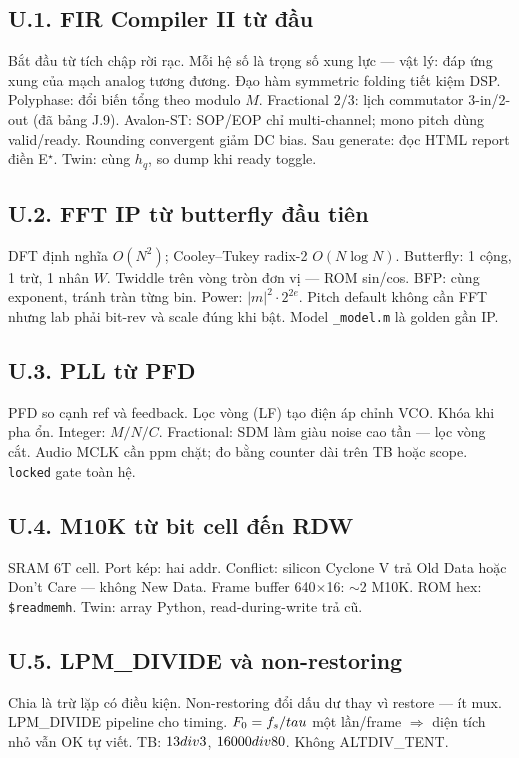 \subsection*{U.1. FIR Compiler II từ đầu}
Bắt đầu từ tích chập rời rạc. Mỗi hệ số là trọng số xung lực --- vật lý: đáp ứng xung của mạch analog tương đương. Đạo hàm symmetric folding tiết kiệm DSP. Polyphase: đổi biến tổng theo modulo $M$. Fractional $2/3$: lịch commutator 3-in/2-out (đã bảng J.9). Avalon-ST: SOP/EOP chỉ multi-channel; mono pitch dùng valid/ready. Rounding convergent giảm DC bias. Sau generate: đọc HTML report điền E$^\star$. Twin: cùng $h_q$, so dump khi ready toggle.

\subsection*{U.2. FFT IP từ butterfly đầu tiên}
DFT định nghĩa $O(N^2)$; Cooley--Tukey radix-2 $O(N\log N)$. Butterfly: 1 cộng, 1 trừ, 1 nhân $W$. Twiddle trên vòng tròn đơn vị --- ROM sin/cos. BFP: cùng exponent, tránh tràn từng bin. Power: $|m|^2\cdot 2^{2e}$. Pitch default không cần FFT nhưng lab phải bit-rev và scale đúng khi bật. Model \texttt{\_model.m} là golden gần IP.

\subsection*{U.3. PLL từ PFD}
PFD so cạnh ref và feedback. Lọc vòng (LF) tạo điện áp chỉnh VCO. Khóa khi pha ổn. Integer: $M/N/C$. Fractional: SDM làm giàu noise cao tần --- lọc vòng cắt. Audio MCLK cần ppm chặt; đo bằng counter dài trên TB hoặc scope. \texttt{locked} gate toàn hệ.

\subsection*{U.4. M10K từ bit cell đến RDW}
SRAM 6T cell. Port kép: hai addr. Conflict: silicon Cyclone V trả Old Data hoặc Don't Care --- không New Data. Frame buffer 640$\times$16: $\sim$2 M10K. ROM hex: \texttt{\$readmemh}. Twin: array Python, read-during-write trả cũ.

\subsection*{U.5. LPM\_DIVIDE và non-restoring}
Chia là trừ lặp có điều kiện. Non-restoring đổi dấu dư thay vì restore --- ít mux. LPM\_DIVIDE pipeline cho timing. $F_0=f_s/\\tau$ một lần/frame $\Rightarrow$ diện tích nhỏ vẫn OK tự viết. TB: $13\\div3$, $16000\\div80$. Không ALTDIV\_TENT.


